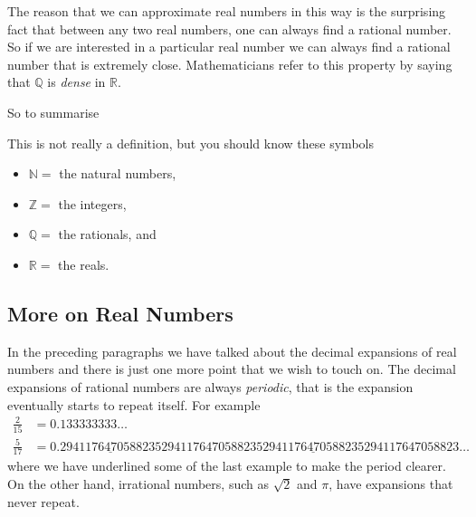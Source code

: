 \begin{itemize}
The reason that we can approximate real numbers in this way is the
surprising fact that between any two real numbers, one can always find a
rational number. So if we are interested in a particular real number we can
always find a rational number that is extremely close. Mathematicians refer
to this property by saying that $\mathbb{Q}$ is \emph{dense} in $\mathbb{R}$.
\end{itemize}
So to summarise
\begin{defn}
  This is not really a definition, but you should know these symbols
 \begin{itemize}
  \item $\mathbb{N} = $ the natural numbers,
  \item $\mathbb{Z} = $ the integers,
  \item $\mathbb{Q} = $ the rationals, and
  \item $\mathbb{R} = $ the reals.
 \end{itemize}

\end{defn}



\subsection*{More on Real Numbers}
In the preceding paragraphs we have talked about the decimal expansions of real
numbers and there is just one more point that we wish to touch on. The decimal
expansions of rational numbers are always \emph{periodic}, that is the expansion
eventually starts to repeat itself. For example
\begin{align*}
  \frac{2}{15} &= 0.133333333\dots \\
  \frac{5}{17} &=
0.\underline{
2941176470588235}2941176470588235\underline{2941176470588235}
294117647058823\dots
\end{align*}
where we have underlined some of the last example to make the period clearer.
On the other hand, irrational numbers, such as $\sqrt{2}$ and $\pi$, have
expansions that never repeat.

